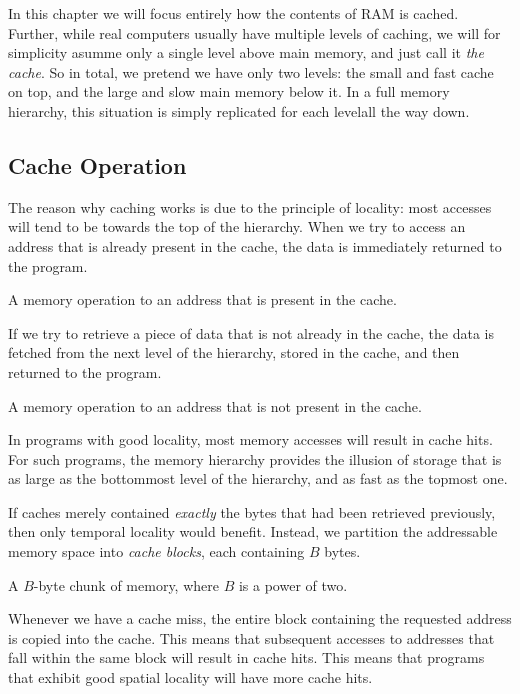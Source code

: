 In this chapter we will focus entirely how the contents of RAM is
cached.  Further, while real computers usually have multiple levels of
caching, we will for simplicity asumme only a single level above main
memory, and just call it \emph{the cache}.  So in total, we pretend we
have only two levels: the small and fast cache on top, and the large
and slow main memory below it.  In a full memory hierarchy, this
situation is simply replicated for each levelall the way down.

\subsection{Cache Operation}

The reason why caching works is due to the principle of locality: most
accesses will tend to be towards the top of the hierarchy.  When we
try to access an address that is already present in the cache, the
data is immediately returned to the program.

\begin{definition}
  A memory operation to an address that is present in the cache.
\end{definition}

If we try to retrieve a piece of data that is not already in the
cache, the data is fetched from the next level of the hierarchy,
stored in the cache, and then returned to the program.

\begin{definition}
  A memory operation to an address that is not present in the cache.
\end{definition}

In programs with good locality, most memory accesses will result in
cache hits.  For such programs, the memory hierarchy provides the
illusion of storage that is as large as the bottommost level of the
hierarchy, and as fast as the topmost one.

If caches merely contained \emph{exactly} the bytes that had been
retrieved previously, then only temporal locality would benefit.
Instead, we partition the addressable memory space into \emph{cache
  blocks}, each containing $B$ bytes.

\begin{definition}
  A $B$-byte chunk of memory, where $B$ is a power of two.
\end{definition}

Whenever we have a cache miss, the entire block containing the
requested address is copied into the cache.  This means that
subsequent accesses to addresses that fall within the same block will
result in cache hits.  This means that programs that exhibit good
spatial locality will have more cache hits.

